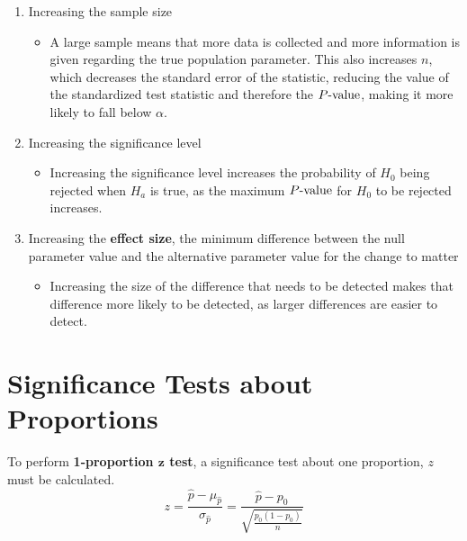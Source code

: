 \documentclass[../AP_Statistics.tex]{subfiles}
\begin{document}
		\begin{enumerate}
			\item 
				Increasing the sample size
				\begin{itemize}
					\item 
						A large sample means that more data is collected and more information is given regarding the true population parameter. This also increases $n$, which decreases the standard error of the statistic, reducing the value of the standardized test statistic and therefore the $P\text{-value}$, making it more likely to fall below $\alpha$.
				\end{itemize}
			\item 
				Increasing the significance level
				\begin{itemize}
					\item 
						Increasing the significance level increases the probability of $H_0$ being rejected when $H_a$ is true, as the maximum $P\text{-value}$ for $H_0$ to be rejected increases.
				\end{itemize}
			\item 
				Increasing the \textbf{effect size}, the minimum difference between the null parameter value and the alternative parameter value for the change to matter
				\begin{itemize}
					\item 
						Increasing the size of the difference that needs to be detected makes that difference more likely to be detected, as larger differences are easier to detect.
				\end{itemize}
		\end{enumerate}
		\section{Significance Tests about Proportions}
			To perform \textbf{1-proportion $\bm{z}$ test}, a significance test about one proportion, $z$ must be calculated. \\
			\[z = \frac{\hat{p} - \mu_{\hat{p}}}{\sigma_{\hat{p}}} = \frac{\hat{p} - p_0}{\sqrt{\frac{p_0(1 - p_0)}{n}}}\]			
\end{document}
